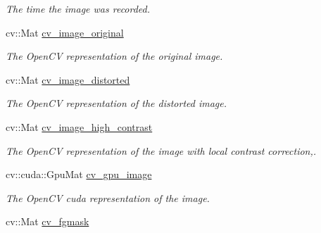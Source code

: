\begin{DoxyCompactItemize}
\begin{DoxyCompactList}\small\item\em The time the image was recorded. \end{DoxyCompactList}\item 
\mbox{\label{structdto_1_1_image_a9f01a32aef2c218d9c846272bb064f2c}} 
cv\+::\+Mat \mbox{\hyperlink{structdto_1_1_image_a9f01a32aef2c218d9c846272bb064f2c}{cv\+\_\+image\+\_\+original}}
\begin{DoxyCompactList}\small\item\em The Open\+CV representation of the original image. \end{DoxyCompactList}\item 
\mbox{\label{structdto_1_1_image_a3ddf150c7798c653fe54c98db9b0fd39}} 
cv\+::\+Mat \mbox{\hyperlink{structdto_1_1_image_a3ddf150c7798c653fe54c98db9b0fd39}{cv\+\_\+image\+\_\+distorted}}
\begin{DoxyCompactList}\small\item\em The Open\+CV representation of the distorted image. \end{DoxyCompactList}\item 
\mbox{\label{structdto_1_1_image_a3cd219134d6758c41897a3fe52d21f15}} 
cv\+::\+Mat \mbox{\hyperlink{structdto_1_1_image_a3cd219134d6758c41897a3fe52d21f15}{cv\+\_\+image\+\_\+high\+\_\+contrast}}
\begin{DoxyCompactList}\small\item\em The Open\+CV representation of the image with local contrast correction,. \end{DoxyCompactList}\item 
\mbox{\label{structdto_1_1_image_afd33feae44b1a44ec506a0951fb691eb}} 
cv\+::cuda\+::\+Gpu\+Mat \mbox{\hyperlink{structdto_1_1_image_afd33feae44b1a44ec506a0951fb691eb}{cv\+\_\+gpu\+\_\+image}}
\begin{DoxyCompactList}\small\item\em The Open\+CV cuda representation of the image. \end{DoxyCompactList}\item 
\mbox{\label{structdto_1_1_image_a3d4c752e9e41370c087f46fc12809840}} 
cv\+::\+Mat \mbox{\hyperlink{structdto_1_1_image_a3d4c752e9e41370c087f46fc12809840}{cv\+\_\+fgmask}}

\end{DoxyCompactItemize}
